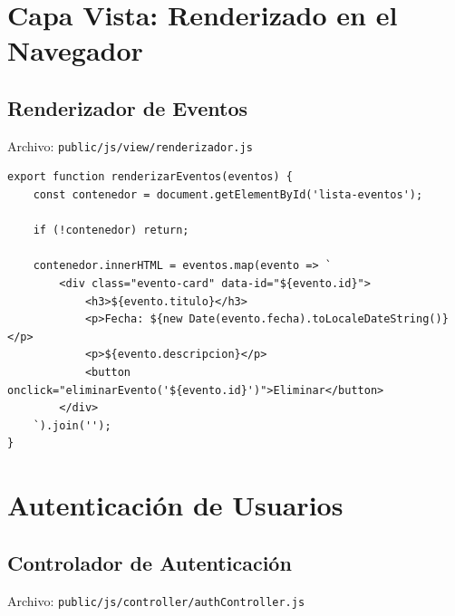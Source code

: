 \documentclass[12pt,a4paper]{article}
\begin{document}
\section{Capa Vista: Renderizado en el Navegador}

\subsection{Renderizador de Eventos}
Archivo: \texttt{public/js/view/renderizador.js}

\begin{lstlisting}
export function renderizarEventos(eventos) {
    const contenedor = document.getElementById('lista-eventos');
    
    if (!contenedor) return;
    
    contenedor.innerHTML = eventos.map(evento => `
        <div class="evento-card" data-id="${evento.id}">
            <h3>${evento.titulo}</h3>
            <p>Fecha: ${new Date(evento.fecha).toLocaleDateString()}</p>
            <p>${evento.descripcion}</p>
            <button onclick="eliminarEvento('${evento.id}')">Eliminar</button>
        </div>
    `).join('');
}
\end{lstlisting}

\section{Autenticación de Usuarios}

\subsection{Controlador de Autenticación}
Archivo: \texttt{public/js/controller/authController.js}
\end{document}
